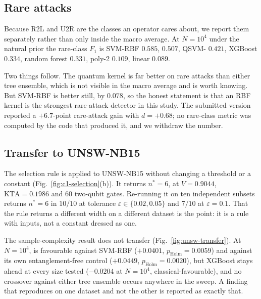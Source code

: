 \subsection{Rare attacks}
\label{sec:res-rare}
\begin{revbody}

Because R2L and U2R are the classes an operator cares about, we report them
separately rather than only inside the macro average. At $N=10^4$ under the
natural prior the rare-class $F_1$ is SVM-RBF $0.585$, \QSVM{} $0.507$,
QSVM-\Zmap{} $0.421$, XGBoost $0.334$, random forest $0.331$, poly-2 $0.109$,
linear $0.089$.

Two things follow. The quantum kernel is far better on rare attacks than either
tree ensemble, which is not visible in the macro average and is worth knowing.
But SVM-RBF is better still, by $0.078$, so the honest statement is that an RBF
kernel is the strongest rare-attack detector in this study. The submitted
version reported a $+6.7$-point rare-attack gain with $d=+0.68$; no rare-class
metric was computed by the code that produced it, and we withdraw the number.
\end{revbody}

\subsection{Transfer to UNSW-NB15}
\label{sec:res-unsw}

\begin{revbody}


The selection rule is applied to UNSW-NB15 without changing a threshold or a
constant (Fig.~\ref{fig:c1-selection}(b)). It returns $n^\ast=6$, at $V=0.9044$,
$\mathrm{KTA}=0.1986$ and $60$ two-qubit gates. Re-running it on ten
independent subsets returns $n^\ast=6$ in $10/10$ at tolerance
$\varepsilon\in\{0.02,0.05\}$ and $7/10$ at $\varepsilon=0.1$. That the rule
returns a different width on a different dataset is the point: it is a rule with
inputs, not a constant dressed as one.

The sample-complexity result does not transfer (Fig.~\ref{fig:unsw-transfer}). At
$N=10^4$, \QSVM{} is favourable against SVM-RBF ($+0.0401$,
$p_{\text{Holm}}=0.0059$) and against its own entanglement-free control
($+0.0449$, $p_{\text{Holm}}=0.0020$), but XGBoost stays ahead at every size
tested ($-0.0204$ at $N=10^4$, classical-favourable), and no crossover against
either tree ensemble occurs anywhere in the sweep. A finding that reproduces on
one dataset and not the other is reported as exactly that.
\end{revbody}

